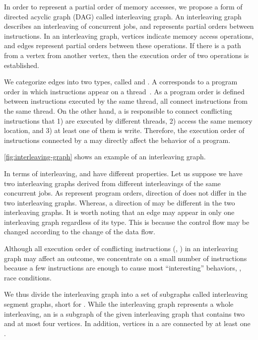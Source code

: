 In order to represent a partial order of memory accesses, we propose a
form of directed acyclic graph (DAG) called interleaving graph.
%
An interleaving graph describes an interleaving of concurrent jobs,
and represents partial orders between instructions.
%
In an interleaving graph, vertices indicate memory access operations,
and edges represent partial orders between these operations.
%
If there is a path from a vertex from another vertex, then the
execution order of two operations is established.

We categorize edges into two types, called \immutables and \mutables.
%
A \immutable corresponds to a program order in which instructions
appear on a thread~\cite{frightening, lkmm}. As a program order is
defined between instructions executed by the same thread, all
\immutables connect instructions from the same thread.
%
On the other hand, a \mutable is responsible to connect conflicting
instructions that 1) are executed by different threads, 2) access the
same memory location, and 3) at least one of them is write.
%
Therefore, the execution order of instructions connected by a \mutable
may directly affect the behavior of a program.


\autoref{fig:interleaving-graph} shows an example of an interleaving
graph.
%


%
In terms of interleaving, \immutables and \mutables have different
properties. Let us suppose we have two interleaving graphs derived
from different interleavings of the same concurrent jobs.
%
As \immutables represent program orders, direction of \immutables does
not differ in the two interleaving graphs.
%
Whereas, a direction of \mutables may be different in the two
interleaving graphs.
%
It is worth noting that an edge may appear in only one interleaving
graph regardless of its type. This is because the control flow may be
changed according to the change of the data flow.


%
Although all execution order of conflicting instructions (\ie,
\mutables) in an interleaving graph may affect an outcome, we
concentrate on a small number of instructions because a few
instructions are enough to cause most ``interesting'' behaviors, \ie,
race conditions.

%
We thus divide the interleaving graph into a set of subgraphs called
interleaving segment graphs, short for \segments.
%
While the interleaving graph represents a whole interleaving, an
\segment is a subgraph of the given interleaving graph that contains
two \mutables and at most four vertices. In addition, vertices in a
\segment are connected by at least one \mutable.

